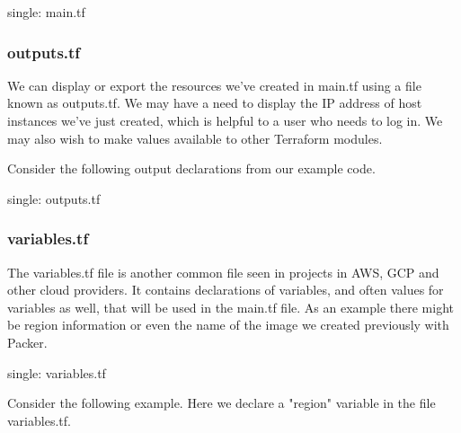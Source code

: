 single: main.tf

\hypertarget{outputs.tf}{%
   \subsubsection{outputs.tf}\label{outputs.tf}}

We can display or export the resources we've created in main.tf using a
file known as outputs.tf. We may have a need to display the IP address
of host instances we've just created, which is helpful to a user who
needs to log in. We may also wish to make values available to other
Terraform modules.

Consider the following output declarations from our example code.

\begin{Shaded}
   \begin{Highlighting}[]
       \NormalTok{ \{}
      \NormalTok{ = }
      \NormalTok{\}}

       \NormalTok{ \{}
      \NormalTok{ = }
      \NormalTok{\}}
   \end{Highlighting}
\end{Shaded}

single: outputs.tf

\hypertarget{variables.tf}{%
   \subsubsection{variables.tf}\label{variables.tf}}

The variables.tf file is another common file seen in projects in AWS,
GCP and other cloud providers. It contains declarations of variables,
and often values for variables as well, that will be used in the main.tf
file. As an example there might be region information or even the name
of the image we created previously with Packer.

single: variables.tf

Consider the following example. Here we declare a "region" variable in
the file variables.tf.

\begin{Shaded}
   \begin{Highlighting}[]
       \NormalTok{ \{}
      \NormalTok{ = }
      \NormalTok{     = }
      \NormalTok{\}}
   \end{Highlighting}
\end{Shaded}

